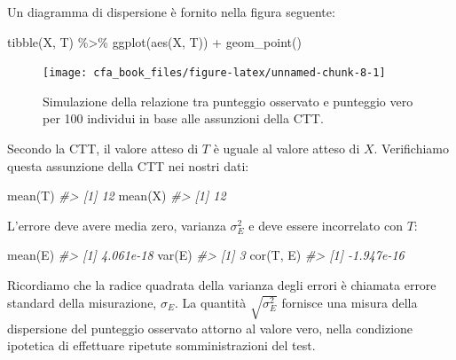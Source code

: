 \documentclass[
  11pt,
]{krantz}
\makeatletter
\newenvironment{Shaded}{\begin{snugshade}}{\end{snugshade}}
\newcommand{\CommentTok}[1]{\textcolor[rgb]{0.37,0.37,0.37}{\textit{#1}}}
\newcommand{\FunctionTok}[1]{\textcolor[rgb]{0,0,0}{#1}}
\newcommand{\NormalTok}[1]{#1}
\newcommand{\SpecialCharTok}[1]{\textcolor[rgb]{0,0,0}{#1}}
\newenvironment{kframe}{%
\medskip{}
\setlength{\fboxsep}{.8em}
 \def\at@end@of@kframe{}%
 \ifinner\ifhmode%
  \def\at@end@of@kframe{\end{minipage}}%
  \begin{minipage}{\columnwidth}%
 \fi\fi%
 \def\FrameCommand##1{\hskip\@totalleftmargin \hskip-\fboxsep
 \colorbox{shadecolor}{##1}\hskip-\fboxsep
     \hskip-\linewidth \hskip-\@totalleftmargin \hskip\columnwidth}%
 \MakeFramed {\advance\hsize-\width
   \@totalleftmargin\z@ \linewidth\hsize
   \@setminipage}}%
 {\par\unskip\endMakeFramed%
 \at@end@of@kframe}
\renewenvironment{Shaded}{\begin{kframe}}{\end{kframe}}
\theoremstyle{definition}
\theoremstyle{definition}
\theoremstyle{definition}
\theoremstyle{definition}
\theoremstyle{remark}
\makeatother
\begin{document}
Un diagramma di dispersione è fornito nella figura seguente:

\begin{Shaded}
\begin{Highlighting}[]
\FunctionTok{tibble}\NormalTok{(X, T) }\SpecialCharTok{\%\textgreater{}\%}
  \FunctionTok{ggplot}\NormalTok{(}\FunctionTok{aes}\NormalTok{(X, T)) }\SpecialCharTok{+}
  \FunctionTok{geom\_point}\NormalTok{()}
\end{Highlighting}
\end{Shaded}

\begin{figure}

{\centering \texttt{[image: cfa\_book\_files/figure-latex/unnamed-chunk-8-1]} 

}

\caption{Simulazione della relazione tra punteggio osservato e punteggio vero per 100 individui in base alle assunzioni della CTT.}\label{fig:unnamed-chunk-8}
\end{figure}

Secondo la CTT, il valore atteso di \(T\) è uguale al valore atteso di \(X\). Verifichiamo questa assunzione della CTT nei nostri dati:

\begin{Shaded}
\begin{Highlighting}[]
\FunctionTok{mean}\NormalTok{(T)}
\CommentTok{\#\textgreater{} [1] 12}
\FunctionTok{mean}\NormalTok{(X)}
\CommentTok{\#\textgreater{} [1] 12}
\end{Highlighting}
\end{Shaded}

L'errore deve avere media zero, varianza \(\sigma_E^2\) e deve essere incorrelato con \(T\):

\begin{Shaded}
\begin{Highlighting}[]
\FunctionTok{mean}\NormalTok{(E)}
\CommentTok{\#\textgreater{} [1] 4.061e{-}18}
\FunctionTok{var}\NormalTok{(E)}
\CommentTok{\#\textgreater{} [1] 3}
\FunctionTok{cor}\NormalTok{(T, E)}
\CommentTok{\#\textgreater{} [1] {-}1.947e{-}16}
\end{Highlighting}
\end{Shaded}

Ricordiamo che la radice quadrata della varianza degli errori è chiamata errore standard della misurazione, \(\sigma_E\). La quantità \(\sqrt{\sigma_E^2}\) fornisce una misura della dispersione del punteggio osservato attorno al valore vero, nella condizione ipotetica di effettuare ripetute somministrazioni del test.
\end{document}
